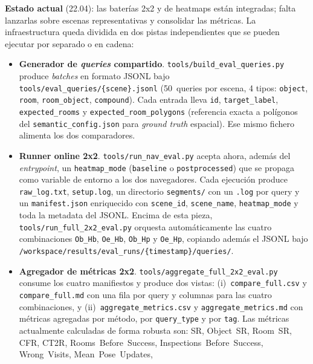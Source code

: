 \documentclass[11pt,a4paper]{article}
\begin{document}
\textbf{Estado actual} (22.04):
\textcolor{partialcol}{las baterías 2x2 y de heatmaps están integradas; falta lanzarlas
sobre escenas representativas y consolidar las métricas}. La infraestructura
queda dividida en dos pistas independientes que se pueden ejecutar por separado
o en cadena:
\begin{itemize}
  \item \textbf{Generador de \emph{queries} compartido}.
        \texttt{tools/build\_eval\_queries.py} produce \emph{batches} en
        formato JSONL bajo \texttt{tools/eval\_queries/\{scene\}.jsonl}
        (50~queries por escena, 4 tipos: \texttt{object}, \texttt{room},
        \texttt{room\_object}, \texttt{compound}). Cada entrada lleva
        \texttt{id}, \texttt{target\_label}, \texttt{expected\_rooms} y
        \texttt{expected\_room\_polygons} (referencia exacta a polígonos
        del \texttt{semantic\_config.json} para \emph{ground truth}
        espacial). Ese mismo fichero alimenta los dos comparadores.
  \item \textbf{Runner online 2x2}.
        \texttt{tools/run\_nav\_eval.py} acepta ahora, además del
        \emph{entrypoint}, un \texttt{heatmap\_mode}
        (\texttt{baseline} o \texttt{postprocessed}) que se propaga como
        variable de entorno a los dos navegadores. Cada ejecución produce
        \texttt{raw\_log.txt}, \texttt{setup.log}, un directorio
        \texttt{segments/} con un \texttt{.log} por query y un
        \texttt{manifest.json} enriquecido con \texttt{scene\_id},
        \texttt{scene\_name}, \texttt{heatmap\_mode} y toda la metadata
        del JSONL. Encima de esta pieza, \texttt{tools/run\_full\_2x2\_eval.py}
        orquesta automáticamente las cuatro combinaciones
        \texttt{Ob\_Hb}, \texttt{Oe\_Hb}, \texttt{Ob\_Hp} y \texttt{Oe\_Hp},
        copiando además el JSONL bajo
        \texttt{/workspace/results/eval\_runs/\{timestamp\}/queries/}.
  \item \textbf{Agregador de métricas 2x2}.
        \texttt{tools/aggregate\_full\_2x2\_eval.py} consume los cuatro
        manifiestos y produce dos vistas: (i)~\texttt{compare\_full.csv}
        y \texttt{compare\_full.md} con una fila por query y columnas para
        las cuatro combinaciones, y (ii)~\texttt{aggregate\_metrics.csv}
        y \texttt{aggregate\_metrics.md} con métricas agregadas por
        método, por \texttt{query\_type} y por \texttt{tag}. Las métricas
        actualmente calculadas de forma robusta son:
        SR, Object~SR, Room~SR, CFR, CT2R, Rooms~Before~Success,
        Inspections~Before~Success, Wrong~Visits, Mean~Pose~Updates,

\end{itemize}
\end{document}
